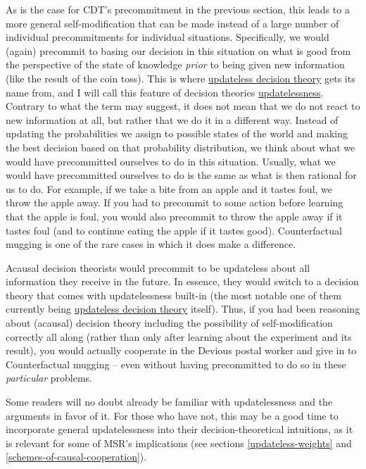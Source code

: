 As is the case for CDT's precommitment in the previous section, this
leads to a more general self-modification that can be made instead of a
large number of individual precommitments for individual situations.
Specifically, we would (again) precommit to basing our decision in this
situation on what is good from the perspective of the state of knowledge
\emph{prior} to being given new information (like the result of the coin
toss). This is where
\href{https://wiki.lesswrong.com/wiki/Updateless_decision_theory}{updateless
decision theory} gets its name from, and I will call this feature of
decision theories
\href{https://casparoesterheld.com/2016/11/21/thoughts-on-updatelessnes/}{updatelessness}.
Contrary to what the term may suggest, it does not mean that we do not
react to new information at all, but rather that we do it in a different
way. Instead of updating the probabilities we assign to possible states
of the world and making the best decision based on that probability
distribution, we think about what we would have precommitted ourselves
to do in this situation. Usually, what we would have precommitted
ourselves to do is the same as what is then rational for us to do. For
example, if we take a bite from an apple and it tastes foul, we throw
the apple away. If you had to precommit to some action before learning
that the apple is foul, you would also precommit to throw the apple away
if it tastes foul (and to continue eating the apple if it tastes good).
Counterfactual mugging is one of the rare cases in which it does make a
difference.

Acausal decision theorists would precommit to be updateless about all
information they receive in the future. In essence, they would switch to
a decision theory that comes with updatelessness built-in (the most
notable one of them currently being
\href{https://wiki.lesswrong.com/wiki/Updateless_decision_theory}{updateless
decision theory}
\parencite{Benson-Tilsen2014-cv,Hintze2014-xs,McAllister_undated-ms}
itself). Thus, if you had been reasoning about (acausal) decision theory
including the possibility of self-modification correctly all along
(rather than only after learning about the experiment and its result),
you would actually cooperate in the Devious postal worker and give in to
Counterfactual mugging -- even without having precommitted to do so in
these \emph{particular} problems.

Some readers will no doubt already be familiar with updatelessness and
the arguments in favor of it. For those who have not, this may be a good
time to incorporate general updatelessness into their
decision-theoretical intuitions, as it is relevant for some of MSR's
implications (see sections
\ref{updateless-weights}
and \ref{schemes-of-causal-cooperation}).

